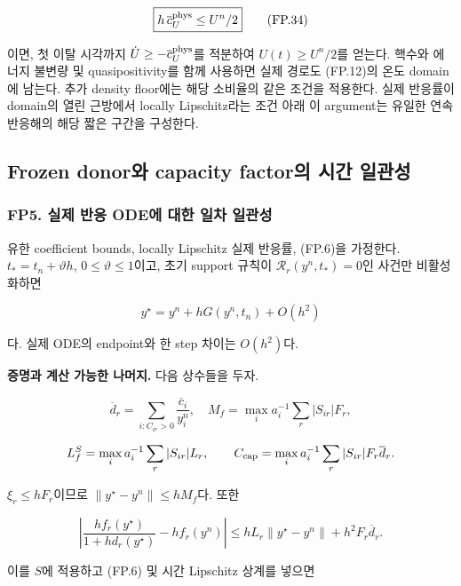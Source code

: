 \documentclass[11pt,a4paper]{article}
\begin{document}
\[
\boxed{
h\,\overline c_U^{\rm phys}\le U^n/2
}
\tag{FP.34}
\]

이면, 첫 이탈 시각까지 \(\dot U\ge-\overline c_U^{\rm phys}\)를 적분하여 \(U(t)\ge U^n/2\)를 얻는다. 핵수와 에너지 불변량 및 quasipositivity를 함께 사용하면 실제 경로도 (FP.12)의 온도 domain에 남는다. 추가 density floor에는 해당 소비율의 같은 조건을 적용한다. 실제 반응률이 domain의 열린 근방에서 locally Lipschitz라는 조건 아래 이 argument는 유일한 연속 반응해의 해당 짧은 구간을 구성한다.

\hypertarget{frozen-donoruxc640-capacity-factoruxc758-uxc2dcuxac04-uxc77cuxad00uxc131}{%
\subsection{Frozen donor와 capacity factor의 시간 일관성}\label{frozen-donoruxc640-capacity-factoruxc758-uxc2dcuxac04-uxc77cuxad00uxc131}}

\hypertarget{fp5.-uxc2e4uxc81c-uxbc18uxc751-odeuxc5d0-uxb300uxd55c-uxc77cuxcc28-uxc77cuxad00uxc131}{%
\subsubsection{FP5. 실제 반응 ODE에 대한 일차 일관성}\label{fp5.-uxc2e4uxc81c-uxbc18uxc751-odeuxc5d0-uxb300uxd55c-uxc77cuxcc28-uxc77cuxad00uxc131}}

유한 coefficient bounds, locally Lipschitz 실제 반응률, (FP.6)을 가정한다. \(t_*=t_n+\vartheta h\), \(0\le\vartheta\le1\)이고, 초기 support 규칙이 \(\mathcal R_r(y^n,t_*)=0\)인 사건만 비활성화하면

\[
y^\star
=
y^n+hG(y^n,t_n)+O(h^2)
\tag{FP.35}
\]

다. 실제 ODE의 endpoint와 한 step 차이는 \(O(h^2)\)다.

\textbf{증명과 계산 가능한 나머지.} 다음 상수들을 두자.

\[
\overline d_r=\sum_{i:C_{ir}>0}\frac{\overline c_i}{y_i^n},\quad
M_f=\max_i a_i^{-1}\sum_r|S_{ir}|F_r,
\]

\[
L_f^S=\max_i a_i^{-1}\sum_r|S_{ir}|L_r,\qquad
C_{\rm cap}=\max_i a_i^{-1}\sum_r|S_{ir}|F_r\overline d_r .
\]

\(\xi_r\le hF_r\)이므로 \(\|y^\star-y^n\|\le hM_f\)다. 또한

\[
\left|
\frac{hf_r(y^\star)}{1+hd_r(y^\star)}
-hf_r(y^n)
\right|
\le
hL_r\|y^\star-y^n\|+h^2F_r\overline d_r.
\]

이를 \(S\)에 적용하고 (FP.6) 및 시간 Lipschitz 상계를 넣으면
\end{document}
